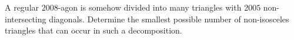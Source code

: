 A regular $2008$-agon is somehow divided into many triangles with $2005$ non-intersecting diagonals.
Determine the smallest possible number of non-isosceles triangles that can occur in such a decomposition.
